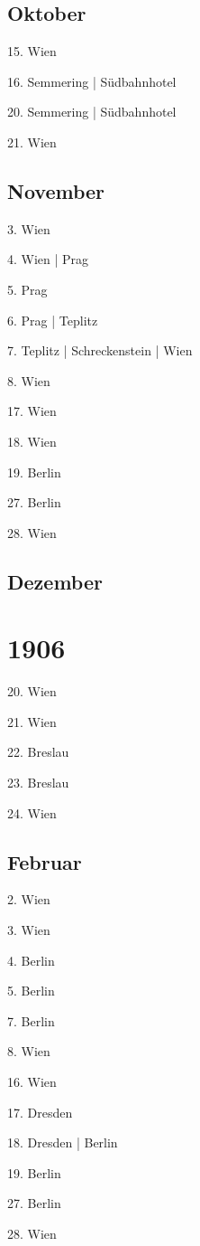 \documentclass[twoside=false,titlepage=false,open=any, parskip=never, fontsize=10pt, headings=small, chapterprefix=false, appendixprefix=false, DIV=15]{scrbook}
\begin{document}
\begin{multicols}{3}
            \section*{Oktober}
            15. Wien\par
            16. Semmering | Südbahnhotel\par
            20. Semmering | Südbahnhotel\par
            21. Wien\par
            \section*{November}
            3. Wien\par
            4. Wien | Prag\par
            5. Prag\par
            6. Prag | Teplitz\par
            7. Teplitz | Schreckenstein | Wien\par
            8. Wien\par
            17. Wien\par
            18. Wien\par
            19. Berlin\par
            27. Berlin\par
            28. Wien\par
            \section*{Dezember}
            \chapter*{1906}
            20. Wien\par
            21. Wien\par
            22. Breslau\par
            23. Breslau\par
            24. Wien\par
            \section*{Februar}
            2. Wien\par
            3. Wien\par
            4. Berlin\par
            5. Berlin\par
            7. Berlin\par
            8. Wien\par
            16. Wien\par
            17. Dresden\par
            18. Dresden | Berlin\par
            19. Berlin\par
            27. Berlin\par
            28. Wien\par

\end{multicols}
\end{document}
